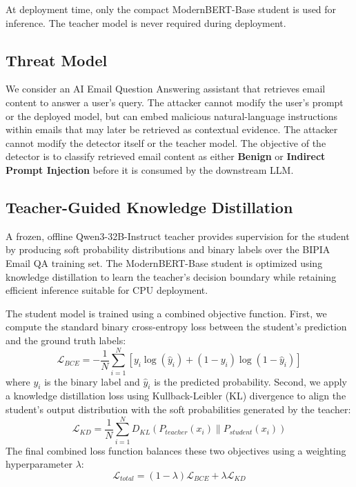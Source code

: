 \documentclass[conference]{IEEEtran}
\begin{document}
At deployment time, only the compact ModernBERT-Base student is used for inference. The teacher model is never required during deployment.

\subsection{Threat Model}

We consider an AI Email Question Answering assistant that retrieves email content to answer a user's query. The attacker cannot modify the user's prompt or the deployed model, but can embed malicious natural-language instructions within emails that may later be retrieved as contextual evidence. The attacker cannot modify the detector itself or the teacher model. The objective of the detector is to classify retrieved email content as either \textbf{Benign} or \textbf{Indirect Prompt Injection} before it is consumed by the downstream LLM.

\subsection{Teacher-Guided Knowledge Distillation}

A frozen, offline Qwen3-32B-Instruct teacher provides supervision for the student by producing soft probability distributions and binary labels over the BIPIA Email QA training set. The ModernBERT-Base student is optimized using knowledge distillation to learn the teacher's decision boundary while retaining efficient inference suitable for CPU deployment.

The student model is trained using a combined objective function. First, we compute the standard binary cross-entropy loss between the student's prediction and the ground truth labels:
\begin{equation}
\mathcal{L}_{BCE} = - \frac{1}{N} \sum_{i=1}^{N} \left[ y_i \log(\hat{y}_i) + (1 - y_i) \log(1 - \hat{y}_i) \right]
\end{equation}
where $y_i$ is the binary label and $\hat{y}_i$ is the predicted probability. Second, we apply a knowledge distillation loss using Kullback-Leibler (KL) divergence to align the student's output distribution with the soft probabilities generated by the teacher:
\begin{equation}
\mathcal{L}_{KD} = \frac{1}{N} \sum_{i=1}^{N} D_{KL}(P_{teacher}(x_i) \parallel P_{student}(x_i))
\end{equation}
The final combined loss function balances these two objectives using a weighting hyperparameter $\lambda$:
\begin{equation}
\mathcal{L}_{total} = (1 - \lambda) \mathcal{L}_{BCE} + \lambda \mathcal{L}_{KD}
\end{equation}
\end{document}
